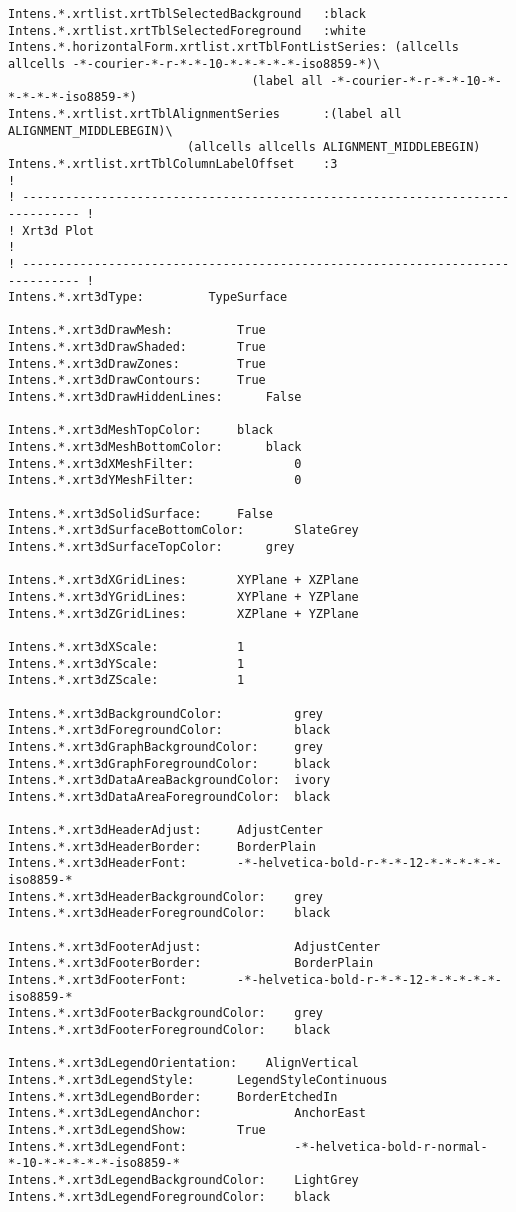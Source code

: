{\begin{verbatim}
Intens.*.xrtlist.xrtTblSelectedBackground	:black
Intens.*.xrtlist.xrtTblSelectedForeground	:white
Intens.*.horizontalForm.xrtlist.xrtTblFontListSeries: (allcells allcells -*-courier-*-r-*-*-10-*-*-*-*-*-iso8859-*)\
         					      (label all -*-courier-*-r-*-*-10-*-*-*-*-*-iso8859-*)
Intens.*.xrtlist.xrtTblAlignmentSeries		:(label all ALIGNMENT_MIDDLEBEGIN)\
						 (allcells allcells ALIGNMENT_MIDDLEBEGIN)
Intens.*.xrtlist.xrtTblColumnLabelOffset	:3
!
! ------------------------------------------------------------------------------ !
! Xrt3d Plot                                                                     !
! ------------------------------------------------------------------------------ !
Intens.*.xrt3dType:			TypeSurface

Intens.*.xrt3dDrawMesh:			True
Intens.*.xrt3dDrawShaded:		True
Intens.*.xrt3dDrawZones:		True
Intens.*.xrt3dDrawContours:		True
Intens.*.xrt3dDrawHiddenLines:		False

Intens.*.xrt3dMeshTopColor:		black
Intens.*.xrt3dMeshBottomColor:		black
Intens.*.xrt3dXMeshFilter:              0
Intens.*.xrt3dYMeshFilter:              0

Intens.*.xrt3dSolidSurface:		False
Intens.*.xrt3dSurfaceBottomColor:       SlateGrey
Intens.*.xrt3dSurfaceTopColor:		grey

Intens.*.xrt3dXGridLines:		XYPlane + XZPlane
Intens.*.xrt3dYGridLines:		XYPlane + YZPlane
Intens.*.xrt3dZGridLines:		XZPlane + YZPlane

Intens.*.xrt3dXScale:			1
Intens.*.xrt3dYScale:			1
Intens.*.xrt3dZScale:			1

Intens.*.xrt3dBackgroundColor:          grey
Intens.*.xrt3dForegroundColor:          black
Intens.*.xrt3dGraphBackgroundColor:     grey
Intens.*.xrt3dGraphForegroundColor:     black
Intens.*.xrt3dDataAreaBackgroundColor:  ivory
Intens.*.xrt3dDataAreaForegroundColor:  black

Intens.*.xrt3dHeaderAdjust:		AdjustCenter
Intens.*.xrt3dHeaderBorder:		BorderPlain
Intens.*.xrt3dHeaderFont:		-*-helvetica-bold-r-*-*-12-*-*-*-*-*-iso8859-*
Intens.*.xrt3dHeaderBackgroundColor:    grey
Intens.*.xrt3dHeaderForegroundColor:    black

Intens.*.xrt3dFooterAdjust:             AdjustCenter
Intens.*.xrt3dFooterBorder:             BorderPlain
Intens.*.xrt3dFooterFont:		-*-helvetica-bold-r-*-*-12-*-*-*-*-*-iso8859-*
Intens.*.xrt3dFooterBackgroundColor:    grey
Intens.*.xrt3dFooterForegroundColor:    black

Intens.*.xrt3dLegendOrientation:	AlignVertical
Intens.*.xrt3dLegendStyle:		LegendStyleContinuous
Intens.*.xrt3dLegendBorder:		BorderEtchedIn
Intens.*.xrt3dLegendAnchor:             AnchorEast
Intens.*.xrt3dLegendShow:		True
Intens.*.xrt3dLegendFont:               -*-helvetica-bold-r-normal-*-10-*-*-*-*-*-iso8859-*
Intens.*.xrt3dLegendBackgroundColor:    LightGrey
Intens.*.xrt3dLegendForegroundColor:    black


\end{verbatim}}
